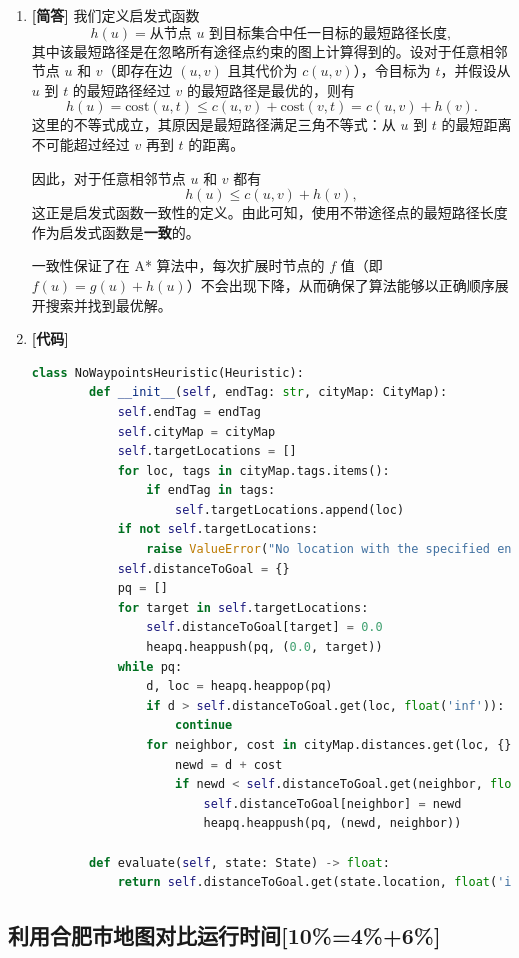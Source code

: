 \documentclass{article}
\begin{document}
\begin{enumerate}[label=(\alph*), start=4]
    \item \textbf{[简答]} %
    我们定义启发式函数
    \[
    h(u) = \text{从节点 } u \text{ 到目标集合中任一目标的最短路径长度},
    \]
    其中该最短路径是在忽略所有途径点约束的图上计算得到的。设对于任意相邻节点 $u$ 和 $v$（即存在边 $(u,v)$ 且其代价为 $c(u,v)$），令目标为 $t$，并假设从 $u$ 到 $t$ 的最短路径经过 $v$ 的最短路径是最优的，则有
    \[
    h(u) = \text{cost}(u,t) \leq c(u,v) + \text{cost}(v,t) = c(u,v) + h(v).
    \]
    这里的不等式成立，其原因是最短路径满足三角不等式：从 $u$ 到 $t$ 的最短距离不可能超过经过 $v$ 再到 $t$ 的距离。
    
    因此，对于任意相邻节点 $u$ 和 $v$ 都有
    \[
    h(u) \leq c(u,v) + h(v),
    \]
    这正是启发式函数一致性的定义。由此可知，使用不带途径点的最短路径长度作为启发式函数是\textbf{一致}的。
    
    一致性保证了在 A* 算法中，每次扩展时节点的 $f$ 值（即 $f(u) = g(u) + h(u)$）不会出现下降，从而确保了算法能够以正确顺序展开搜索并找到最优解。
    
    \item \textbf{[代码]} %
    \begin{lstlisting}[language=Python]
    class NoWaypointsHeuristic(Heuristic):
    	def __init__(self, endTag: str, cityMap: CityMap):
    		self.endTag = endTag
    		self.cityMap = cityMap
    		self.targetLocations = []
    		for loc, tags in cityMap.tags.items():
    			if endTag in tags:
    				self.targetLocations.append(loc)
    		if not self.targetLocations:
    			raise ValueError("No location with the specified endTag found in cityMap.")
    		self.distanceToGoal = {}  
    		pq = []  
    		for target in self.targetLocations:
    			self.distanceToGoal[target] = 0.0
    			heapq.heappush(pq, (0.0, target))
    		while pq:
    			d, loc = heapq.heappop(pq)
    			if d > self.distanceToGoal.get(loc, float('inf')):
    				continue
    			for neighbor, cost in cityMap.distances.get(loc, {}).items():
    				newd = d + cost
    				if newd < self.distanceToGoal.get(neighbor, float('inf')):
    					self.distanceToGoal[neighbor] = newd
    					heapq.heappush(pq, (newd, neighbor))
    
    	def evaluate(self, state: State) -> float:
    		return self.distanceToGoal.get(state.location, float('inf'))
    \end{lstlisting}
\end{enumerate}

\subsection{利用合肥市地图对比运行时间[10\%=4\%+6\%]}
\end{document}
